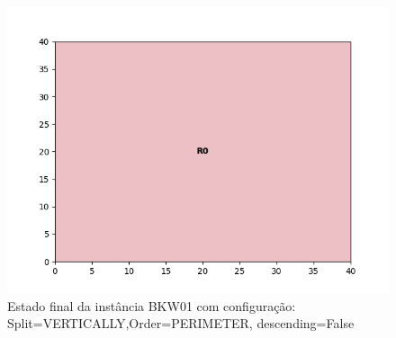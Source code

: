 \begin{figure}[H]
    \centering
    \caption[]{Estado final da instância BKW01 com configuração: Split=VERTICALLY,Order=PERIMETER, descending=False}
    \label{fig:bkw01-vertically-perimeter-false}
    \includegraphics[scale=0.5]{output/figures/bkw/bkw01/vertically/perimeter/false/00}
\end{figure}